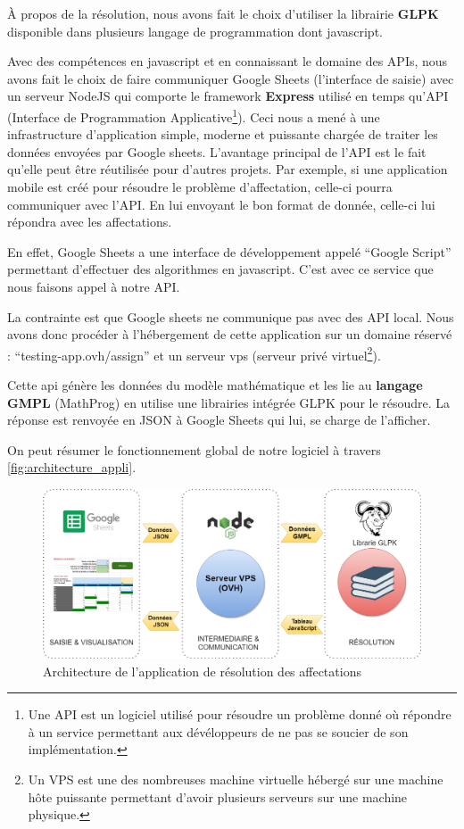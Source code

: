 \documentclass{polytech/polytech}
\begin{document}
À propos de la résolution, nous avons fait le choix d’utiliser la librairie \textbf{GLPK} disponible dans plusieurs langage de programmation dont javascript. 

Avec des compétences en javascript et en connaissant le domaine des APIs, nous avons fait le choix de faire communiquer Google Sheets (l’interface de saisie) avec un serveur NodeJS qui comporte le framework \textbf{Express} utilisé en temps qu’API (Interface de Programmation Applicative\footnote{Une API est un logiciel utilisé pour résoudre un problème donné où répondre à un service permettant aux dévéloppeurs de ne pas se soucier de son implémentation.}).
 Ceci nous a mené à une  infrastructure d’application simple, moderne et puissante chargée de traiter les données envoyées par Google sheets.
L’avantage principal de l’API est le fait qu’elle peut être réutilisée pour d’autres projets. 
Par exemple, si une application mobile est créé pour résoudre le problème d’affectation, celle-ci pourra communiquer avec l’API.
En lui envoyant le bon format de donnée, celle-ci lui répondra avec les affectations. 

En effet, Google Sheets a une interface de développement appelé “Google Script” permettant d’effectuer des algorithmes en javascript.
C'est avec ce service que nous faisons appel à notre API.

La contrainte est que Google sheets ne communique pas avec des API local. Nous avons donc procéder à l'hébergement de cette application sur un domaine réservé : “testing-app.ovh/assign” et un serveur vps (serveur privé virtuel\footnote{Un VPS est une des nombreuses machine virtuelle hébergé sur une machine hôte puissante permettant d'avoir plusieurs serveurs sur une machine physique.}).

Cette api génère les données du modèle mathématique et les lie au \textbf{langage GMPL} (MathProg) en utilise une librairies intégrée GLPK pour le résoudre. 
La réponse est renvoyée en JSON à Google Sheets qui lui, se charge de l’afficher.

On peut résumer le fonctionnement global de notre logiciel à travers \autoref{fig:architecture_appli}.

\begin{figure}[htbp]
\includegraphics[width=15cm]{images/architecture_appli}
\caption{\label{fig:architecture_appli} Architecture de l'application de résolution des affectations}
\end{figure}
\end{document}
